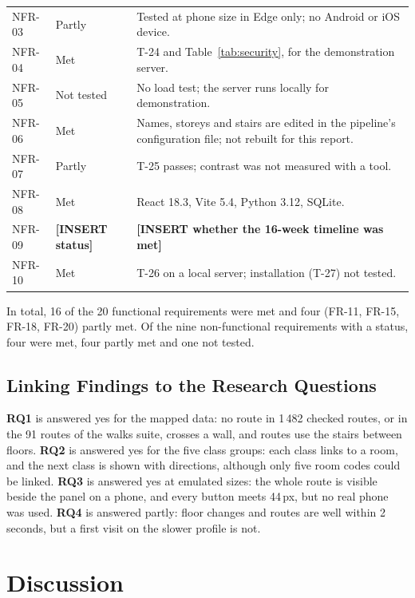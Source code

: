 \documentclass[12pt,a4paper]{report}
\newcommand{\placeholder}[1]{\textbf{[INSERT #1]}}
\begin{document}
{\begin{longtable}{p{1.4cm}p{1.9cm}p{10.4cm}}
NFR-03 & Partly & Tested at phone size in Edge only; no Android or iOS device. \\
NFR-04 & Met & T-24 and Table~\ref{tab:security}, for the demonstration server. \\
NFR-05 & Not tested & No load test; the server runs locally for demonstration. \\
NFR-06 & Met & Names, storeys and stairs are edited in the pipeline's configuration file; not rebuilt for this report. \\
NFR-07 & Partly & T-25 passes; contrast was not measured with a tool. \\
NFR-08 & Met & React 18.3, Vite 5.4, Python 3.12, SQLite. \\
NFR-09 & \placeholder{status} & \placeholder{whether the 16-week timeline was met} \\
NFR-10 & Met & T-26 on a local server; installation (T-27) not tested. \\
\end{longtable}}

In total, 16 of the 20 functional requirements were met and four (FR-11, FR-15, FR-18, FR-20) partly met. Of the nine non-functional requirements with a status, four were met, four partly met and one not tested.

\section{Linking Findings to the Research Questions}
\textbf{RQ1} is answered yes for the mapped data: no route in 1\,482 checked routes, or in the 91 routes of the walks suite, crosses a wall, and routes use the stairs between floors. \textbf{RQ2} is answered yes for the five class groups: each class links to a room, and the next class is shown with directions, although only five room codes could be linked. \textbf{RQ3} is answered yes at emulated sizes: the whole route is visible beside the panel on a phone, and every button meets 44\,px, but no real phone was used. \textbf{RQ4} is answered partly: floor changes and routes are well within 2 seconds, but a first visit on the slower profile is not.

\chapter{Discussion}\label{ch:discussion}
\end{document}
